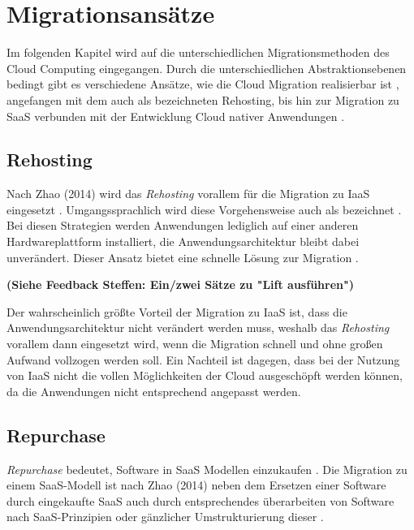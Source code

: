 \section{Migrationsansätze}
\label{sec:migrationsansaetze}


Im folgenden Kapitel wird auf die unterschiedlichen Migrationsmethoden des Cloud Computing eingegangen. Durch die unterschiedlichen Abstraktionsebenen bedingt gibt es verschiedene Ansätze, wie die Cloud Migration realisierbar ist \cite[Vgl.][S. 226]{Surianarayanan2019}, angefangen mit dem auch als \grqq{} bezeichneten Rehosting, bis hin zur Migration zu \ac{SaaS} verbunden mit der Entwicklung Cloud nativer Anwendungen \cite[Vgl.][S. 144]{Zhao2014}.

\subsection{Rehosting}
Nach Zhao (2014) wird das \textit{Rehosting} vorallem für die Migration zu \ac{IaaS} eingesetzt \cite[Vgl.][S. 144]{Zhao2014}. Umgangssprachlich wird diese Vorgehensweise auch als \grqq{} bezeichnet \cite[Vgl.][]{NetApp}. Bei diesen Strategien werden Anwendungen lediglich auf einer anderen Hardwareplattform installiert, die Anwendungsarchitektur bleibt dabei unverändert. Dieser Ansatz bietet eine schnelle Lösung zur Migration \cite[Vgl.][]{CIO}.

\textbf{(Siehe Feedback Steffen: Ein/zwei Sätze zu "Lift ausführen")}

Der wahrscheinlich größte Vorteil der Migration zu \ac{IaaS} ist, dass die Anwendungsarchitektur nicht verändert werden muss, weshalb das \textit{Rehosting} vorallem dann eingesetzt wird, wenn die Migration schnell und ohne großen Aufwand vollzogen werden soll. Ein Nachteil ist dagegen, dass bei der Nutzung von \ac{IaaS} nicht die vollen Möglichkeiten der Cloud ausgeschöpft werden können, da die Anwendungen nicht entsprechend angepasst werden.

\subsection{Repurchase}
\textit{Repurchase} bedeutet, Software in \ac{SaaS} Modellen einzukaufen \cite[Vgl.][S. 2]{Ahmad2018}. Die Migration zu einem \ac{SaaS}-Modell ist nach Zhao (2014) neben dem Ersetzen einer Software durch eingekaufte \acs{SaaS} auch durch entsprechendes überarbeiten von Software nach \ac{SaaS}-Prinzipien oder gänzlicher Umstrukturierung dieser \cite[Vgl.][S. 144]{Zhao2014}. 

